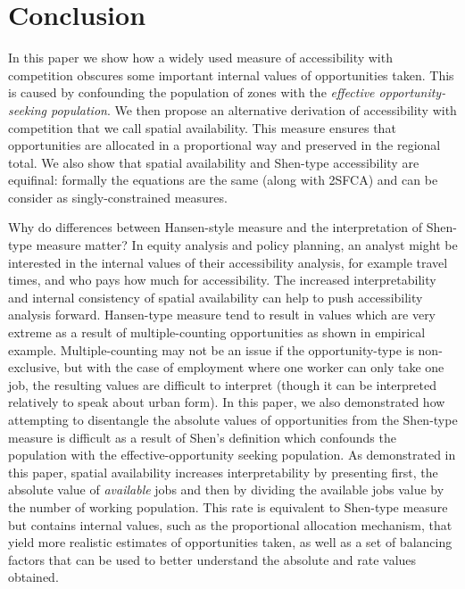 \documentclass[]{elsarticle} %
\begin{document}
\newpage

\hypertarget{conclusion}{%
\section{Conclusion}\label{conclusion}}

In this paper we show how a widely used measure of accessibility with
competition obscures some important internal values of opportunities
taken. This is caused by confounding the population of zones with the
\emph{effective opportunity-seeking population}. We then propose an
alternative derivation of accessibility with competition that we call
spatial availability. This measure ensures that opportunities are
allocated in a proportional way and preserved in the regional total. We
also show that spatial availability and Shen-type accessibility are
equifinal: formally the equations are the same (along with 2SFCA) and
can be consider as singly-constrained measures.

Why do differences between Hansen-style measure and the interpretation
of Shen-type measure matter? In equity analysis and policy planning, an
analyst might be interested in the internal values of their
accessibility analysis, for example travel times, and who pays how much
for accessibility. The increased interpretability and internal
consistency of spatial availability can help to push accessibility
analysis forward. Hansen-type measure tend to result in values which are
very extreme as a result of multiple-counting opportunities as shown in
empirical example. Multiple-counting may not be an issue if the
opportunity-type is non-exclusive, but with the case of employment where
one worker can only take one job, the resulting values are difficult to
interpret (though it can be interpreted relatively to speak about urban
form). In this paper, we also demonstrated how attempting to disentangle
the absolute values of opportunities from the Shen-type measure is
difficult as a result of Shen's definition which confounds the
population with the effective-opportunity seeking population. As
demonstrated in this paper, spatial availability increases
interpretability by presenting first, the absolute value of
\emph{available} jobs and then by dividing the available jobs value by
the number of working population. This rate is equivalent to Shen-type
measure but contains internal values, such as the proportional
allocation mechanism, that yield more realistic estimates of
opportunities taken, as well as a set of balancing factors that can be
used to better understand the absolute and rate values obtained.
\end{document}
